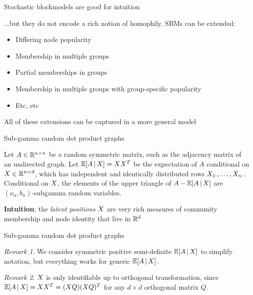\documentclass{beamer}
\theoremstyle{remark}
\newtheorem*{remark}{Remark}
\begin{document}
\begin{frame}{Stochastic blockmodels are good for intuition}

    ...but they do not encode a rich notion of homophily. SBMs can be extended:

    \begin{itemize}
        \item Differing node popularity
        \item Membership in multiple groups
        \item Partial memberships in groups
        \item Membership in multiple groups with group-specific popularity
        \item Etc, etc
    \end{itemize}

    All of these extensions can be captured in a more general model

\end{frame}

\begin{frame}{Sub-gamma random dot product graphs}

    \begin{definition}

        Let $A \in \mathbb{R}^{n \times n}$ be a random symmetric matrix, such as the adjacency matrix of an undirected graph. Let $\E[\X]{A} = \X \X^T$ be the expectation of $A$ conditional on $X \in \mathbb{R}^{n \times d}$, which has independent and identically distributed rows $X_{1 \cdot}, \dots, X_{n \cdot}$. Conditional on $X$, the elements of the upper triangle of $A - \E[\X]{A}$ are $(\nu_n, b_n)$-subgamma random variables.

    \end{definition}

    \textbf{Intuition}: the \emph{latent positions} $X$ are very rich measures of community membership and node identity that live in $\mathbb{R}^d$

\end{frame}

\begin{frame}{Sub-gamma random dot product graphs}

    \begin{remark}
        We consider symmetric positive semi-definite $\E[\X]{A}$ to simplify notation, but everything works for generic $\E[\X]{A}$.
    \end{remark}

    \begin{remark}
        $X$ is only identifiable up to orthogonal transformation, since $\E[\X]{A} = \X \X^T = (\X Q) (\X Q)^T$ for any $d \times d$ orthogonal matrix $Q$.
    \end{remark}

\end{frame}
\end{document}
